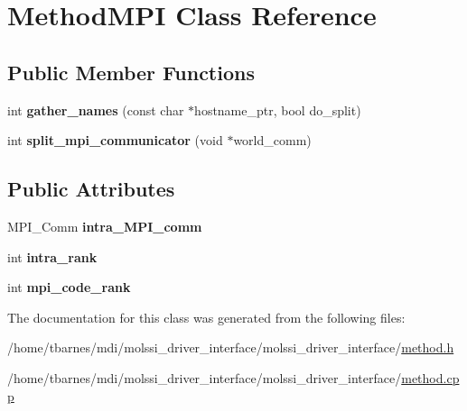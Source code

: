 \hypertarget{classMethodMPI}{\section{Method\-M\-P\-I Class Reference}
\label{classMethodMPI}
}
\subsection*{Public Member Functions}
\begin{DoxyCompactItemize}
\item 
\hypertarget{classMethodMPI_ad1c0de09adc11a28665ff79c8a8c0204}{int {\bfseries gather\-\_\-names} (const char $\ast$hostname\-\_\-ptr, bool do\-\_\-split)}\label{classMethodMPI_ad1c0de09adc11a28665ff79c8a8c0204}

\item 
\hypertarget{classMethodMPI_ac6eb460a524a9fe7e36e6a14eabc2c4a}{int {\bfseries split\-\_\-mpi\-\_\-communicator} (void $\ast$world\-\_\-comm)}\label{classMethodMPI_ac6eb460a524a9fe7e36e6a14eabc2c4a}

\end{DoxyCompactItemize}
\subsection*{Public Attributes}
\begin{DoxyCompactItemize}
\item 
\hypertarget{classMethodMPI_a9d6daa11fdd9246e8c1eea2cb0376162}{M\-P\-I\-\_\-\-Comm {\bfseries intra\-\_\-\-M\-P\-I\-\_\-comm}}\label{classMethodMPI_a9d6daa11fdd9246e8c1eea2cb0376162}

\item 
\hypertarget{classMethodMPI_a01db6ba3138f94147b56ab34bcec4f66}{int {\bfseries intra\-\_\-rank}}\label{classMethodMPI_a01db6ba3138f94147b56ab34bcec4f66}

\item 
\hypertarget{classMethodMPI_a089003d4d1c9b32d8f7a7a67cd544a80}{int {\bfseries mpi\-\_\-code\-\_\-rank}}\label{classMethodMPI_a089003d4d1c9b32d8f7a7a67cd544a80}

\end{DoxyCompactItemize}


The documentation for this class was generated from the following files\-:\begin{DoxyCompactItemize}
\item 
/home/tbarnes/mdi/molssi\-\_\-driver\-\_\-interface/molssi\-\_\-driver\-\_\-interface/\hyperlink{method_8h}{method.\-h}\item 
/home/tbarnes/mdi/molssi\-\_\-driver\-\_\-interface/molssi\-\_\-driver\-\_\-interface/\hyperlink{method_8cpp}{method.\-cpp}\end{DoxyCompactItemize}
